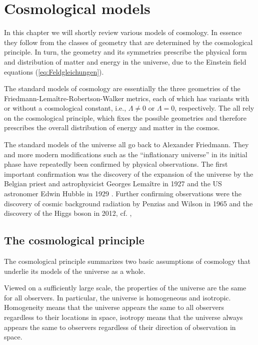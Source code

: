 \chapter{Cosmological models}

In this chapter we will shortly review various models of cosmology. In essence they follow from the classes of geometry that are determined by the cosmological principle. In turn, the geometry and its symmetries prescribe the physical form and distribution of matter and energy in the universe, due to the Einstein field equations (\ref{eq:Feldgleichungen}).

The standard models of cosmology are essentially the three geometries of the Fried\-mann-Le\-maît\-re-Ro\-bert\-son-Walk\-er metrics, each of which has variants with or without a cosmological constant, i.e., $\Lambda \ne 0$ or $\Lambda = 0$, respectively. The all rely on the cosmological principle, which fixes the possible geometries and therefore prescribes the overall distribution of energy and matter in the cosmos.

The standard models of the universe all go back to Alexander Friedmann. They and more modern modifications such as the “inflationary universe” in its initial phase have repeatedly been confirmed by physical observations. The first important confirmation was the discovery of the expansion of the universe by the Belgian priest and astrophysicist Georges Lemaître in 1927 \cite{Lemaitre-1927} and the US astronomer Edwin Hubble in 1929 \cite{Hubble-1929}. Further confirming observations were the discovery of cosmic background radiation by Penzias and Wilson in 1965 and the discovery of the Higgs boson in 2012, cf.
\cite[§20.1]{Karttunen-et-al-2000},
\cite[§13.3]{Unsoeld-Baschek-1999}


\section{The cosmological principle}
The cosmological principle summarizes two basic assumptions of cosmology that underlie its models of the universe as a whole. %

\begin{axiom}
	\label{axiom:cosmological-principle}
	Viewed on a sufficiently large scale, the properties of the universe are the same for all observers.
	In particular, the universe is homogeneous and isotropic.
	Homogeneity means that the universe appears the same to all observers regardless to their locations in space, isotropy means that the universe always appears the same to observers regardless of their direction of observation in space.
\end{axiom}

